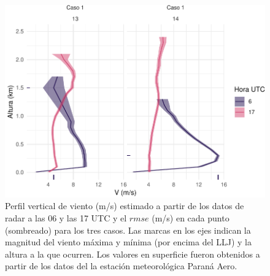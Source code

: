 \documentclass[12pt,spanish,oneside, a4paper]{book}
\begin{document}
\begin{figure}

{\centering \includegraphics{00_Paper_files/figure-latex/perfiles-1} 

}

\caption{Perfil vertical de viento (m/s) estimado a partir de los datos de radar a las 06 y las 17 UTC y el $rmse$ (m/s) en cada punto (sombreado) para los tres casos. Las marcas en los ejes indican la magnitud del viento máxima y mínima (por encima del LLJ) y la altura a la que ocurren. Los valores en superficie fueron obtenidos a partir de los datos del la estación meteorológica Paraná Aero. \label{perfiles-horarios}}\label{fig:perfiles}
\end{figure}
\end{document}
